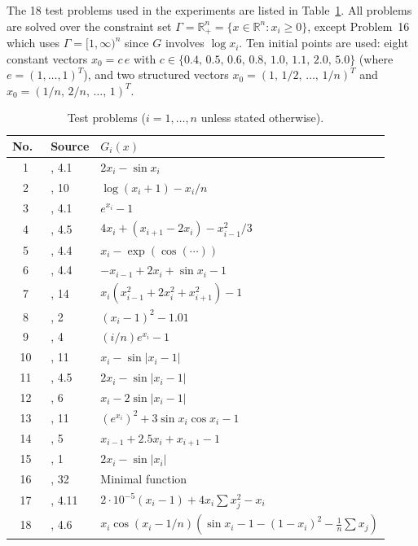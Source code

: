 \documentclass{article}
\theoremstyle{plain}
\theoremstyle{definition}
\theoremstyle{remark}
\newcommand{\R}{\mathbb{R}}
\begin{document}
The 18 test problems used in the experiments are listed in Table~\ref{tab:testproblems}. All problems are solved over the constraint set $\Gamma = \R^n_+ = \{x \in \R^n : x_i \geq 0\}$, except Problem~16 which uses $\Gamma = [1,\infty)^n$ since $G$ involves $\log x_i$. Ten initial points are used: eight constant vectors $x_0 = c\,e$ with $c \in \{0.4,\, 0.5,\, 0.6,\, 0.8,\, 1.0,\, 1.1,\, 2.0,\, 5.0\}$ (where $e = (1,\ldots,1)^T$), and two structured vectors $x_0 = (1,\, 1/2,\, \ldots,\, 1/n)^T$ and $x_0 = (1/n,\, 2/n,\, \ldots,\, 1)^T$.

\begin{table}[htbp]
\centering
\caption{Test problems ($i = 1,\ldots,n$ unless stated otherwise).}\label{tab:testproblems}
\small
\begin{tabular}{@{}cll@{}}
\toprule
No.\ & Source & $G_i(x)$ \\
\midrule
1 & \cite{sabi2020two}, 4.1 & $2x_i - \sin x_i$ \\
2 & \cite{la2006spectral}, 10 & $\log(x_i+1) - x_i/n$ \\
3 & \cite{zheng2020conjugate}, 4.1 & $e^{x_i} - 1$ \\
4 & \cite{sabi2023modified}, 4.5 & $4x_i + (x_{i+1}-2x_i) - x_{i-1}^2/3$ \\
5 & \cite{zheng2020conjugate}, 4.4 & $x_i - \exp(\cos(\cdots))$ \\
6 & \cite{zheng2020conjugate}, 4.4 & $-x_{i-1} + 2x_i + \sin x_i - 1$ \\
7 & \cite{song2024efficient}, 14 & $x_i(x_{i-1}^2 + 2x_i^2 + x_{i+1}^2) - 1$ \\
8 & \cite{song2024efficient}, 2 & $(x_i - 1)^2 - 1.01$ \\
9 & \cite{song2024efficient}, 4 & $(i/n)e^{x_i} - 1$ \\
10 & \cite{ibrahim2024two}, 11 & $x_i - \sin|x_i - 1|$ \\
11 & \cite{waziri2022two}, 4.5 & $2x_i - \sin|x_i - 1|$ \\
12 & \cite{song2024efficient}, 6 & $x_i - 2\sin|x_i - 1|$ \\
13 & \cite{song2024efficient}, 11 & $(e^{x_i})^2 + 3\sin x_i\cos x_i - 1$ \\
14 & \cite{waziri2020descent}, 5 & $x_{i-1} + 2.5x_i + x_{i+1} - 1$ \\
15 & \cite{zhou2007limited}, 1 & $2x_i - \sin|x_i|$ \\
16 & \cite{la2006spectral}, 32 & Minimal function \\
17 & \cite{li2021scaled}, 4.11 & $2\!\cdot\!10^{-5}(x_i-1) + 4x_i\sum x_j^2 - x_i$ \\
18 & \cite{sabi2023modified}, 4.6 & $x_i\cos(x_i - 1/n)(\sin x_i - 1 - (1-x_i)^2 - \frac{1}{n}\sum x_j)$ \\
\bottomrule
\end{tabular}
\end{table}
\end{document}
